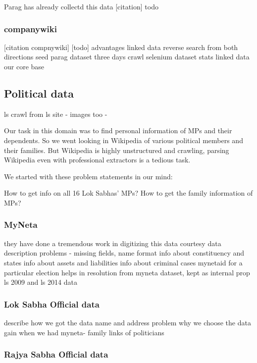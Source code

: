 Parag has already collectd this data [citation] todo



\subsubsection{companywiki}
[citation compnywiki]
[todo]
advantages
linked data
reverse search from both directions
seed parag dataset
three days crawl selenium
dataset stats
linked data
our core base


\subsection{Political data}

ls crawl from ls site - images too - 

Our task in this domain was to find personal information of MPs and their dependents. So we went looking in Wikipedia of various political members and their families. But Wikipedia is highly unstructured and crawling, parsing Wikipedia even with professional extractors is a tedious task.

We started with these problem statements in our mind:

How to get info on all 16 Lok Sabhas’ MPs?
How to get the family information of MPs?

\subsubsection{MyNeta}

they have done a tremendous work in digitizing this data
courtesy
data description
problems -  missing fields, name format
info about constituency and states 
info about assets and liabilities
info about criminal cases
mynetaid for a particular election helps in resolution from myneta dataset, kept as internal prop
ls 2009 and ls 2014 data

\subsubsection{Lok Sabha Official data}

describe how we got the data
name and address problem
why we choose the data gain when we had myneta- family links of politicians


\subsubsection{Rajya Sabha Official data}

